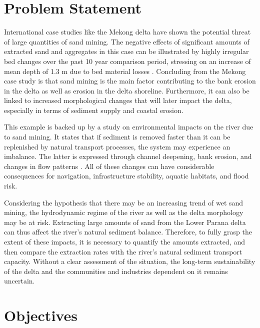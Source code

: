 \section{Problem Statement}

International case studies like the Mekong delta have shown the potential threat of large quantities of sand mining. The negative effects of significant amounts of extracted sand and aggregates in this case can be illustrated by highly irregular bed changes over the past 10 year comparison period, stressing on an increase of mean depth of 1.3 m due to bed material losses \autocite{brunierRecentMorphologicalChanges2014}. Concluding from the Mekong case study is that sand mining is the main factor contributing to the bank erosion in the delta as well as erosion in the delta shoreline. Furthermore, it can also be linked to increased morphological changes that will later impact the delta, especially in terms of sediment supply and coastal erosion.

This example is backed up by a study on environmental impacts on the river due to sand mining. It states that if sediment is removed faster than it can be replenished by natural transport processes, the system may experience an imbalance. The latter is expressed through channel deepening, bank erosion, and changes in flow patterns \autocite{rentierEnvironmentalImpactsRiver2022}. All of these changes can have considerable consequences for navigation, infrastructure stability, aquatic habitats, and flood risk. 

Considering the hypothesis that there may be an increasing trend of wet sand mining, the hydrodynamic regime of the river as well as the delta morphology may be at risk. Extracting large amounts of sand from the Lower Parana delta can thus affect the river's natural sediment balance. Therefore, to fully grasp the extent of these impacts, it is necessary to quantify the amounts extracted, and then compare the extraction rates with the river’s natural sediment transport capacity. Without a clear assessment of the situation, the long-term sustainability of the delta and the communities and industries dependent on it remains uncertain.

\section{Objectives}



